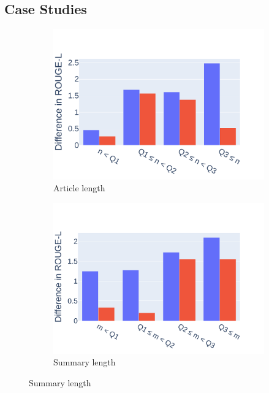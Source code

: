\subsection{Case Studies}

\begin{figure}[ht]
    \centering
    \begin{subfigure}[b]{0.32\textwidth}
        \includegraphics[width=1\textwidth]{images/chapter5/diff_in_len_barchart_nolegend.pdf}
        \caption{Article length}
    \end{subfigure}
    \begin{subfigure}[b]{0.32\textwidth}
        \includegraphics[width=\textwidth]{images/chapter5/diff_out_len_barchart_nolegend.pdf}
        \caption{Summary length}
    \end{subfigure}

\end{figure}
